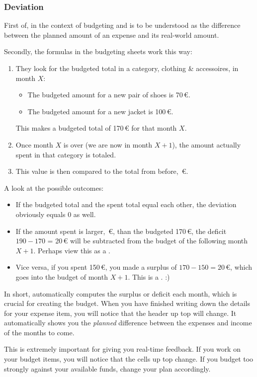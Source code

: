 \subsubsection{Deviation}
\label{subsubsec:budeting-deviation}

First of,  in the context of budgeting and \tfn is to be understood as the difference between the planned amount of an expense and its real-world amount.

Secondly, the formulas in the budgeting sheets work this way:
\begin{enumerate}
	\item They look for the budgeted total in a category, \eg clothing \& accessoires, in month \( X \):
	\begin{itemize}
		\item The budgeted amount for a new pair of shoes is 70\,€.
		\item The budgeted amount for a new jacket is 100\,€.
	\end{itemize}
	This makes a budgeted total of 170\,€ for that month \( X \).
	\item Once month \( X \) is over (we are now in month \( X+1 \)), the amount actually spent in that category is totaled.
	\item This value is then compared to the total from before, \,€.
\end{enumerate}

A look at the possible outcomes:
\begin{itemize}
	\item If the budgeted total and the spent total equal each other, the deviation obviously equals 0 as well.
	\item If the amount spent is larger, \,€, than the budgeted 170\,€, the deficit \( 190-170 \) = 20\,€ will be subtracted from the budget of the following month \( X+1 \).
	Perhaps view this as a .
	\item Vice versa, if you spent 150\,€, you made a surplus of \( 170-150 = 20 \)\,€, which goes into the budget of month \( X+1 \).
	This is a . :)
\end{itemize}

In short, \tfn automatically computes the surplus or deficit each month, which is crucial for creating the budget.
When you have finished writing down the details for your expense item, you will notice that the header up top will change.
It automatically shows you the \emph{planned} difference between the expenses and income of the months to come.
\begin{specialnote}
	This is extremely important for giving you real-time feedback.
	If you work on your budget items, you will notice that the cells up top change.
	If you budget too strongly against your available funds, change your plan accordingly.
\end{specialnote}

